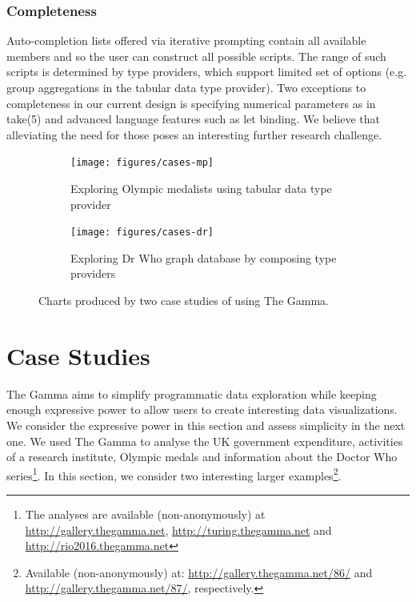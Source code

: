 \documentclass[manuscript,review,anonymous]{acmart}
\newcommand{\ikvd}[1]{{\fontfamily{zi4}\selectfont\small #1}}
\begin{document}
\subsubsection*{Completeness} Auto-completion lists offered via iterative prompting contain
all available members and so the user can construct all possible scripts. The range of such scripts
is determined by type providers, which support limited set of options (e.g. group aggregations in
the tabular data type provider). Two exceptions to completeness in our current design is specifying
numerical parameters as in \ikvd{take(5)} and advanced language features such as let binding.
We believe that alleviating the need for those poses an interesting further research challenge.


\begin{figure}[b]
\centering
\begin{subfigure}[b]{0.49\textwidth}
  \centering
  \texttt{[image: figures/cases-mp]}
  \caption{Exploring Olympic medalists using tabular data type provider}
  \label{fig:cases-mp}
\end{subfigure}
\hfill
\begin{subfigure}[b]{0.49\textwidth}
  \centering
  \texttt{[image: figures/cases-dr]}
  \caption{Exploring Dr Who graph database by composing type providers}
  \label{fig:cases-dr}
\end{subfigure}
\vspace{-0.5em}
\caption{Charts produced by two case studies of using The Gamma.}
\label{fig:cases}
\end{figure}


\section{Case Studies}
\label{sec:cases}

The Gamma aims to simplify programmatic data exploration while keeping enough expressive power
to allow users to create interesting data visualizations. We consider the expressive power in
this section and assess simplicity in the next one. We used The Gamma to analyse
the UK government expenditure, activities of a research institute, Olympic medals and
information about the Doctor Who series\footnote{The analyses are available (non-anonymously)
at \url{http://gallery.thegamma.net}, \url{http://turing.thegamma.net} and \url{http://rio2016.thegamma.net}}.
In this section, we consider two interesting larger examples\footnote{Available
(non-anonymously) at: \url{http://gallery.thegamma.net/86/} and  \url{http://gallery.thegamma.net/87/}, respectively.}.
\end{document}
